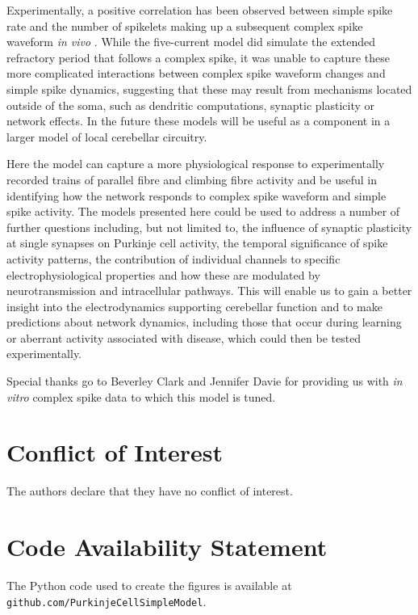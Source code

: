\documentclass[twocolumn]{svjour3}          %
\begin{document}
Experimentally, a positive correlation has been observed between
simple spike rate and the number of spikelets making up a subsequent
complex spike waveform \textit{in vivo}
\citep{BurroughsEtAl2016}. While the five-current model did simulate
the extended refractory period that follows a complex spike, it was
unable to capture these more complicated interactions between complex
spike waveform changes and simple spike dynamics, suggesting that
these may result from mechanisms located outside of the soma, such as
dendritic computations, synaptic plasticity or network effects. In the
future these models will be useful as a component in a larger model of
local cerebellar circuitry.

Here the model can capture a more physiological response to
experimentally recorded trains of parallel fibre and climbing fibre
activity and be useful in identifying how the network responds to
complex spike waveform and simple spike activity. The models presented
here could be used to address a number of further questions including,
but not limited to, the influence of synaptic plasticity at single
synapses on Purkinje cell activity, the temporal significance of spike
activity patterns, the contribution of individual channels to specific
electrophysiological properties and how these are modulated by
neurotransmission and intracellular pathways. This will enable us to
gain a better insight into the electrodynamics supporting cerebellar
function and to make predictions about network dynamics, including
those that occur during learning or aberrant activity associated with
disease, which could then be tested experimentally.


\begin{acknowledgements}
Special thanks go to Beverley Clark and Jennifer Davie for providing
us with \textit{in vitro} complex spike data to which this model is
tuned.
\end{acknowledgements}

\section*{Conflict of Interest}
The authors declare that they have no conflict of interest.

\section*{Code Availability Statement}
The Python code used to create the figures is available at \texttt{github.com/PurkinjeCellSimpleModel}.



\end{document}
